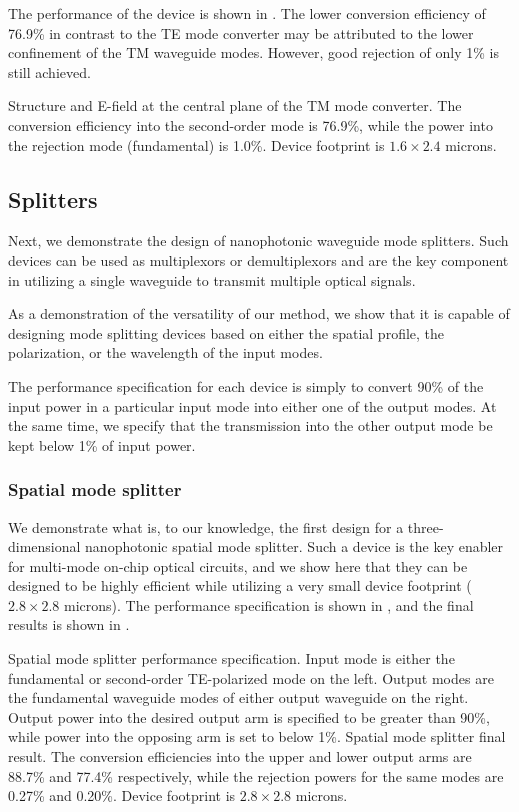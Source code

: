 \documentclass[letterpaper,10pt]{article}
\begin{document}
The performance of the device is shown in .
The lower conversion efficiency of 76.9\% in contrast to the TE mode converter
    may be attributed to the lower confinement of the TM waveguide modes.
However, good rejection of only 1\% is still achieved.

    {Structure and E-field at the central plane of the TM mode converter.
    The conversion efficiency into the second-order mode is 76.9\%,
    while the power into the rejection mode (fundamental) is 1.0\%.
    Device footprint is $1.6\times2.4$ microns.}

\subsection{Splitters}
Next, we demonstrate the design of nanophotonic waveguide mode splitters.
Such devices can be used as multiplexors or demultiplexors and
    are the key component in utilizing a single waveguide to transmit 
    multiple optical signals.

As a demonstration of the versatility of our method, 
    we show that it is capable of designing mode splitting devices 
    based on either the spatial profile, the polarization, or the wavelength
    of the input modes.

The performance specification for each device is simply to convert
    90\% of the input power in a particular input mode into
    either one of the output modes.
At the same time, we specify that the transmission into the other output mode 
    be kept below 1\% of input power.

\subsubsection{Spatial mode splitter}
We demonstrate what is, to our knowledge, 
    the first design for a three-dimensional
    nanophotonic spatial mode splitter.
Such a device is the key enabler for multi-mode on-chip optical circuits,
    and we show here that they can be designed to be highly efficient
    while utilizing a very small device footprint ($2.8\times2.8$ microns). 
The performance specification is shown in ,
    and the final results is shown in .

    {Spatial mode splitter performance specification.
    Input mode is either the fundamental or second-order
        TE-polarized mode on the left.
    Output modes are the fundamental waveguide modes of either output 
        waveguide on the right.
    Output power into the desired output arm is specified to be greater than 90\%,
        while power into the opposing arm is set to below 1\%.}
    {Spatial mode splitter final result.
    The conversion efficiencies into the upper and lower output arms
        are 88.7\% and 77.4\% respectively, 
        while the rejection powers for the same modes are 0.27\% and 0.20\%.
    Device footprint is $2.8\times2.8$ microns.}
\end{document}
